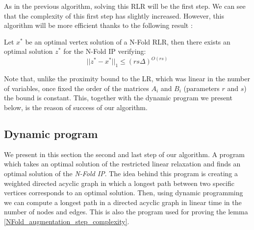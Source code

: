 \vspace{-5pt}
As in the previous algorithm, solving this RLR will be the first step. We can see that the complexity of this first step has slightly increased. However, this algorithm will be more efficient thanks to the following result \cite[Section 3]{EISENBRAND:2020}:

\begin{lemma}\label{NFold_proximity_bound}
    Let $x^*$ be an optimal vertex solution of a N-Fold RLR, then there exists an optimal solution $z^*$ for the N-Fold IP verifying:  
    \vspace{-5pt}
    \begin{equation*}
        ||z^* - x^*||_1 \leq (rs\Delta)^{O(rs)}
    \end{equation*}
\end{lemma}

\vspace{-5pt}
Note that, unlike the proximity bound to the LR, which was linear in the number of variables, once fixed the order of the matrices $A_i$ and $B_i$ (parameters $r$ and $s$) the bound is constant. This, together with the dynamic program we present below, is the reason of success of our algorithm.

\subsection{Dynamic program}        

We present in this section the second and last step of our algorithm. A program which takes an optimal solution of the restricted linear relaxation and finds an optimal solution of the \emph{N-Fold IP}. The idea behind this program \cite{EISENBRAND:2020} is creating a weighted directed acyclic graph in which a longest path between two specific vertices corresponds to an optimal solution. Then, using dynamic programming we can compute a longest path in a directed acyclic graph in linear time in the number of nodes and edges. This is also the program used for proving the lemma \ref{NFold_augmentation_step_complexity}.

